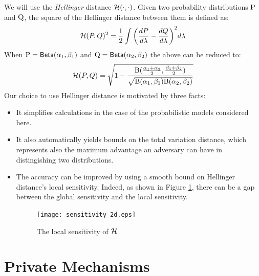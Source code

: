 \documentclass{article}
\begin{document}
We will use the \emph{Hellinger} distance $\mathcal{H}(\cdot,\cdot)$.
Given two probability distributions $\textup{P}$ and $\textup{Q}$,
the square of the Hellinger distance between them is defined as:
\[
\mathcal{H}(P,Q)^2 =\frac{1}{2} \int \bigg(\frac{dP}{d \lambda} - \frac{dQ}{d \lambda}\bigg)^2 d \lambda
\]
When $\textup{P}=\mathsf{Beta}(\alpha_1, \beta_1)$ and $\textup{Q}=\mathsf{Beta}(\alpha_2, \beta_2)$ the above can be reduced to: 
\[
 \mathcal{H}(P,Q) =  \sqrt{1 - \frac{\textup{B}(\frac{\alpha_1 + \alpha_2}{2}, \frac{\beta_1 + \beta_2}{2})}{\sqrt{\textup{B}(\alpha_1,\beta_1)\textup{B}(\alpha_2,\beta_2)}}}
\]
Our choice to use Hellinger distance is motivated by three facts:
\begin{itemize}
  \item It simplifies calculations in the case of the probabilistic models considered here.
  
  \item It also automatically yields bounds on the total variation distance, which represents also the maximum advantage an adversary can have in distingishing two distributions. 

  \item The accuracy can be improved by using a smooth bound on Hellinger distance's local sensitivity. Indeed, as shown in Figure \ref{fig_sensitivity}, there can be a gap
    between the global sensitivity and the local sensitivity.
\begin{figure}[ht]
\centering
\texttt{[image: sensitivity\_2d.eps]}
\caption{{The local sensitivity of $\mathcal{H}$}}
\label{fig_sensitivity}
\end{figure}
\end{itemize}



\section{Private Mechanisms}
\label{sec_mechs}
\end{document}
